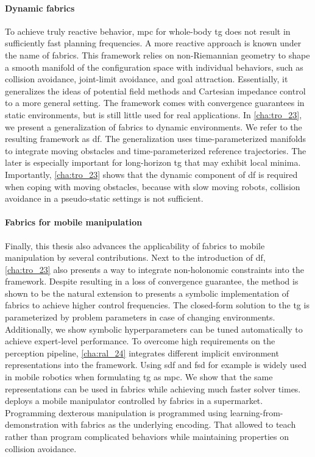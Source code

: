 \paragraph{Dynamic fabrics}
To achieve truly reactive behavior, \ac{mpc} for whole-body \ac{tg} does not
result in sufficiently fast planning frequencies. A more reactive approach is
known under the name of \ac{fabrics}. This framework relies on non-Riemannian
geometry to shape a smooth manifold of the configuration space with individual
behaviors, such as collision avoidance, joint-limit avoidance, and goal 
attraction. Essentially, it generalizes the ideas of potential field methods
and Cartesian impedance control to a more general setting. The framework comes
with convergence guarantees in static environments, but is still little used
for real applications. In \cref{cha:tro_23}, we present a generalization of
\ac{fabrics} to dynamic environments. We refer to the resulting framework as
\ac{df}. The generalization uses time-parameterized manifolds to integrate 
moving obstacles and time-parameterized reference trajectories. The later is
especially important for long-horizon \ac{tg} that may exhibit local minima.
Importantly, \cref{cha:tro_23} shows that the dynamic component of \ac{df}
is required when coping with moving obstacles, because with slow moving robots,
collision avoidance in a pseudo-static settings is not sufficient.

\paragraph{Fabrics for mobile manipulation}
Finally, this thesis also advances the applicability of \ac{fabrics} to mobile
manipulation by several contributions. 
Next to the introduction of \ac{df}, \cref{cha:tro_23} also presents a way to
integrate non-holonomic constraints into the framework. Despite resulting in a
loss of convergence guarantee, the method is shown to be the natural extension
to 
 presents a symbolic
implementation of \ac{fabrics} to achieve higher control frequencies. The
closed-form solution to the \ac{tg} is parameterized by problem parameters in
case of changing environments. Additionally, we show symbolic 
hyperparameters can be tuned automatically to achieve expert-level performance.
To overcome high requirements on the perception pipeline, \cref{cha:ral_24}
integrates different implicit environment representations into the framework.
Using \ac{sdf} and \ac{fsd} for example is widely used in mobile robotics when
formulating \ac{tg} as \ac{mpc}. We show that the same representations can be
used in \ac{fabrics} while achieving much faster solver times.
 deploys a mobile manipulator controlled by \ac{fabrics}
in a supermarket. Programming dexterous manipulation is programmed using
learning-from-demonstration with \ac{fabrics} as the underlying encoding.
That allowed to teach rather than program complicated behaviors while
maintaining properties on collision avoidance.

